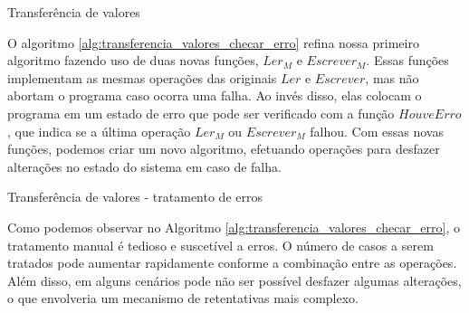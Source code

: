 \documentclass[11pt,twoside,a4paper]{book}
\begin{document}
\begin{algorithm}
\caption{Transferência de valores}
\label{alg:transferencia_valores_sem_transacao}
\end{algorithm}

O algoritmo \ref{alg:transferencia_valores_checar_erro} refina nossa primeiro algoritmo fazendo uso de duas novas funções, $Ler_M$ e $Escrever_M$. Essas funções implementam as mesmas operações das originais $Ler$ e $Escrever$, mas não abortam o programa caso ocorra uma falha. Ao invés disso, elas colocam o programa em um estado de erro que pode ser verificado com a função $HouveErro$, que indica se a última operação $Ler_M$ ou $Escrever_M$ falhou. Com essas novas funções, podemos criar um novo algoritmo, efetuando operações para desfazer alterações no estado do sistema em caso de falha.

\begin{algorithm}
\caption{Transferência de valores - tratamento de erros}
\label{alg:transferencia_valores_checar_erro}
\end{algorithm}

Como podemos observar no Algoritmo \ref{alg:transferencia_valores_checar_erro}, o tratamento manual é tedioso e suscetível a erros. O número de casos a serem tratados pode aumentar rapidamente conforme a combinação entre as operações. Além disso, em alguns cenários pode não ser possível desfazer algumas alterações, o que envolveria um mecanismo de retentativas mais complexo.
\end{document}
